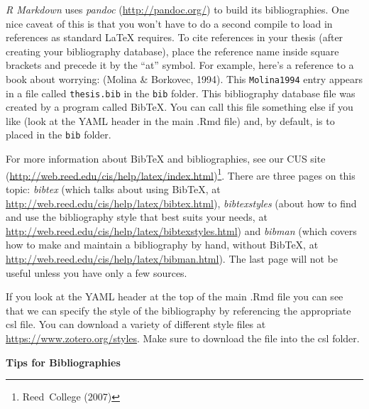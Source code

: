 \documentclass[12pt,twoside]{reedthesis}
\theoremstyle{definition}
\theoremstyle{definition}
\theoremstyle{remark}
\begin{document}
  \emph{R Markdown} uses \emph{pandoc} (\url{http://pandoc.org/}) to build
  its bibliographies. One nice caveat of this is that you won't have to do
  a second compile to load in references as standard LaTeX requires. To
  cite references in your thesis (after creating your bibliography
  database), place the reference name inside square brackets and precede
  it by the ``at'' symbol. For example, here's a reference to a book about
  worrying: (Molina \& Borkovec, 1994). This \texttt{Molina1994} entry
  appears in a file called \texttt{thesis.bib} in the \texttt{bib} folder.
  This bibliography database file was created by a program called BibTeX.
  You can call this file something else if you like (look at the YAML
  header in the main .Rmd file) and, by default, is to placed in the
  \texttt{bib} folder.
  
  For more information about BibTeX and bibliographies, see our CUS site
  (\url{http://web.reed.edu/cis/help/latex/index.html})\footnote{Reed~College
    (2007)}. There are three pages on this topic: \emph{bibtex} (which
  talks about using BibTeX, at
  \url{http://web.reed.edu/cis/help/latex/bibtex.html}),
  \emph{bibtexstyles} (about how to find and use the bibliography style
  that best suits your needs, at
  \url{http://web.reed.edu/cis/help/latex/bibtexstyles.html}) and
  \emph{bibman} (which covers how to make and maintain a bibliography by
  hand, without BibTeX, at
  \url{http://web.reed.edu/cis/help/latex/bibman.html}). The last page
  will not be useful unless you have only a few sources.
  
  If you look at the YAML header at the top of the main .Rmd file you can
  see that we can specify the style of the bibliography by referencing the
  appropriate csl file. You can download a variety of different style
  files at \url{https://www.zotero.org/styles}. Make sure to download the
  file into the csl folder.
  
  \textbf{Tips for Bibliographies}
  
\end{document}
